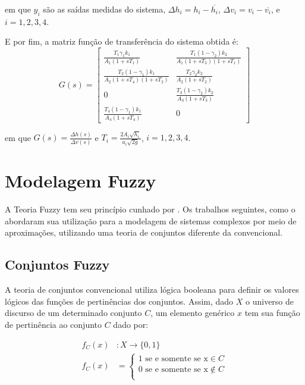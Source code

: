 em que $y_{i}$ são as saídas medidas do sistema, $\Delta h_{i}=h_{i} - \overline{h_{i}}$, $\Delta v_{i}=v_{i} - \overline{v_{i}}$, e $i=1,2,3,4$.

E por fim, a matriz função de transferência do sistema obtida é:
\begin{equation}
	G(s) = 
	\begin{bmatrix}
		\frac{T_{1}\gamma_{1}k_{1}}{A_{1}(1+sT_{1})} &  \frac{T_{1}(1-\gamma_{2})k_{2}}{A_{1}(1+sT_{3})(1+sT_{1})} \\
		\frac{T_{2}(1-\gamma_{1})k_{1}}{A_{2}(1+sT_{4})(1+sT_{2})} &  \frac{T_{2}\gamma_{2}k_{2}}{A_{2}(1+sT_{2})} \\
		0 &  \frac{T_{3}(1-\gamma_{2})k_{2}}{A_{3}(1+sT_{3})} \\
		\frac{T_{4}(1-\gamma_{1})k_{1}}{A_{4}(1+sT_{4})} &  0 
	\end{bmatrix}
	\label{eq4}
\end{equation}

em que $G(s)=\frac{\Delta h(s)}{\Delta v(s)}$ e $T_{i}=\frac{2A_{i}\sqrt{h_{i}}}{a_{i}\sqrt{2g}}$, $i=1,2,3,4$.

\section{Modelagem Fuzzy} \label{secModFuzzy}
\indent A Teoria Fuzzy tem seu princípio cunhado por \cite{zadeh65}. Os trabalhos seguintes, como o \cite{takagi_sugeno} abordaram sua utilização para a modelagem de sistemas complexos por meio de aproximações, utilizando uma teoria de conjuntos diferente da convencional.

\subsection{Conjuntos Fuzzy}
\indent A teoria de conjuntos convencional utiliza lógica booleana para definir os valores lógicos das funções de pertinências dos conjuntos. Assim, dado $X$ o universo de discurso de um determinado conjunto $C$, um elemento genérico $x$ tem sua função de pertinência ao conjunto $C$ dado por:

\begin{align*}
	f_{C}(x)&:X \rightarrow \{0,1\} \quad \\
	f_{C}(x)&= 
	\begin{cases}
		1 \text{ se e somente se x} \in C \\
		0 \text{ se e somente se x} \notin C\\
	\end{cases}
\end{align*}

